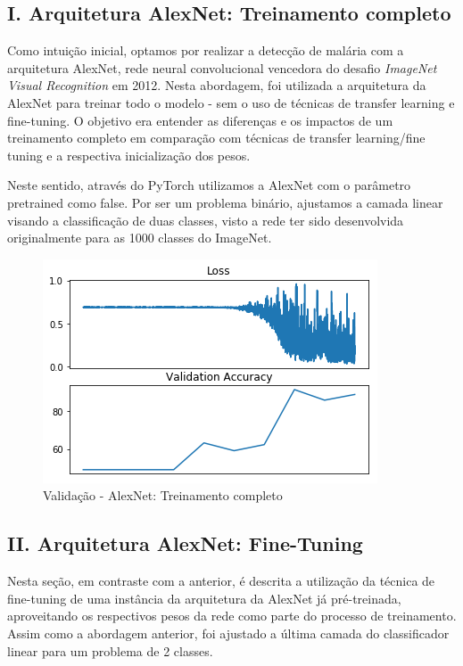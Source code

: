 \documentclass{sigchi}
\begin{document}
\subsection{I. Arquitetura AlexNet: Treinamento completo}
Como intuição inicial, optamos por realizar a detecção de malária com a arquitetura AlexNet, rede neural convolucional vencedora do desafio \textit{ImageNet Visual Recognition} em 2012. Nesta abordagem, foi utilizada a arquitetura da AlexNet para treinar todo o modelo - sem o uso de técnicas de transfer learning e fine-tuning. O objetivo era entender as diferenças e os impactos de um treinamento completo em comparação com técnicas de transfer learning/fine tuning e a respectiva inicialização dos pesos.

Neste sentido, através do PyTorch utilizamos a AlexNet com o parâmetro pretrained como false. Por ser um problema binário, ajustamos a camada linear visando a classificação de duas classes, visto a rede ter sido desenvolvida originalmente para as 1000 classes do ImageNet.

\begin{figure}[ht!]
\centering
\includegraphics[scale=0.5]{./figures/alexnet.png}
\caption{Validação - AlexNet: Treinamento completo}
\label{fig:alexnet}
\end{figure}

\subsection{II. Arquitetura AlexNet: Fine-Tuning}
Nesta seção, em contraste com a anterior, é descrita a utilização da técnica de fine-tuning de uma instância da arquitetura da AlexNet já pré-treinada, aproveitando os respectivos pesos da rede como parte do processo de treinamento. Assim como a abordagem anterior, foi ajustado a última camada do classificador linear para um problema de 2 classes.
\end{document}
